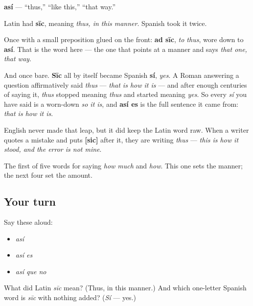 \begin{cousinweb}
\textbf{así} — \textquotedblleft{}thus,\textquotedblright{} \textquotedblleft{}like this,\textquotedblright{} \textquotedblleft{}that way.\textquotedblright{}

Latin had \textbf{sīc}, meaning \emph{thus, in this manner}. Spanish took it twice.

Once with a small preposition glued on the front: \textbf{ad sīc}, \emph{to thus}, wore down to \textbf{así}. That is the word here — the one that points at a manner and says \emph{that one, that way}.

And once bare. \textbf{Sīc} all by itself became Spanish \textbf{sí}, \emph{yes}. A Roman answering a question affirmatively said \emph{thus} — \emph{that is how it is} — and after enough centuries of saying it, \emph{thus} stopped meaning \emph{thus} and started meaning \emph{yes}. So every \emph{sí} you have said is a worn-down \emph{so it is}, and \textbf{así es} is the full sentence it came from: \emph{that is how it is}.

English never made that leap, but it did keep the Latin word raw. When a writer quotes a mistake and puts \textbf{{[}sic{]}} after it, they are writing \emph{thus} — \emph{this is how it stood, and the error is not mine}.
\end{cousinweb}

\begin{grammarlens}[title={What you've built}]
The first of five words for saying \emph{how much} and \emph{how}. This one sets the manner; the next four set the amount.
\end{grammarlens}

\subsection*{Your turn}
Say these aloud:

\begin{itemize}
\raggedright
  \item \emph{así}
  \item \emph{así es}
  \item \emph{así que no}
\end{itemize}

\begin{tcolorbox}[breakable,colback=teal!4,colframe=teal!35!black,title={Before you move on}]
What did Latin \emph{sīc} mean? (Thus, in this manner.) And which one-letter Spanish word is \emph{sīc} with nothing added? (\emph{Sí} — yes.)
\end{tcolorbox}
